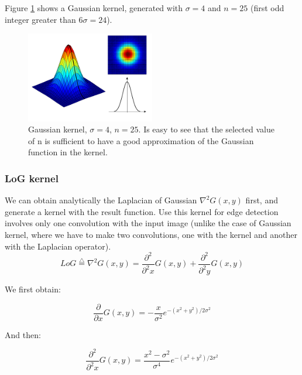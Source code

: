 \documentclass{ipol}
\numberwithin{equation}{section}
\numberwithin{table}{section}
\numberwithin{figure}{section}
\begin{document}
Figure \ref{fig:gaussian_kernel} shows a Gaussian kernel, generated with $\sigma = 4$ and $n = 25$ 
(first odd integer greater than $6\sigma=24$).\\

\begin{figure}
	\centering
	\includegraphics[width=0.5\textwidth]{kernel_gaussian.pdf}
	\caption{Gaussian kernel, $\sigma=4$, $n=25$. Is easy to see that the selected value of n is 
sufficient to have a good approximation of the Gaussian function in the kernel.}
	\label{fig:gaussian_kernel}
\end{figure}

\subsubsection{LoG kernel}

We can obtain analytically the Laplacian of Gaussian $\nabla^2G(x,y)$ first, and generate a kernel 
with the result function. Use this kernel for edge detection involves only one convolution with 
the input image (unlike the case of Gaussian kernel, where we have to make two convolutions, one 
with the kernel and another with the Laplacian operator).\\

\begin{equation}
	LoG \stackrel{\triangle}{=}\nabla^2G(x,y)=\frac{\partial^2}{\partial^2 x}G(x,y) + \frac{\partial^2}{\partial^2 y}G(x,y)
\end{equation}

We first obtain:

\begin{equation} 
	\frac{\partial}{\partial x}G(x,y)=-\frac{x}{\sigma^2}e^{-(x^2+y^2)/2\sigma^2}
\end{equation}

And then:

\begin{equation} 
	\frac{\partial^2}{\partial^2 x}G(x,y)=\frac{x^2-\sigma^2}{\sigma^4}e^{-(x^2+y^2)/2\sigma^2} 
\end{equation}
\end{document}

